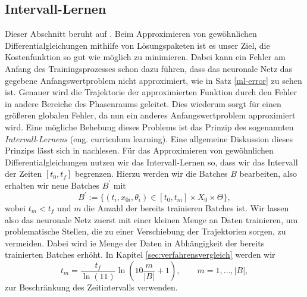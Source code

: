 \subsection{Intervall-Lernen}
\label{subsec:curriculum-learning}
Dieser Abschnitt beruht auf \cite{cedricflamantPersonlicheKommunikation2022}.
Beim Approximieren von gewöhnlichen Differentialgleichungen mithilfe von Lösungspaketen ist es unser Ziel, die
Kostenfunktion so gut wie möglich zu minimieren. Dabei kann ein Fehler am Anfang des Trainingsprozesses schon dazu
führen, dass das neuronale Netz das gegebene Anfangswertproblem nicht approximiert, wie in Satz \ref{ml-error} zu sehen
ist. Genauer wird die Trajektorie der approximierten Funktion durch den Fehler in andere Bereiche des Phasenraums
geleitet. Dies wiederum sorgt für einen größeren globalen Fehler, da nun ein anderes Anfangswertproblem approximiert
wird. Eine mögliche Behebung dieses Problems ist das Prinzip des sogenannten \textit{Intervall}-\textit{Lernens}
(eng. curriculum learning). Eine allgemeine Diskussion dieses Prinzips lässt sich in \cite{bengioCurriculumLearning2009}
nachlesen. Für das Approximieren von gewöhnlichen Differentialgleichungen nutzen wir das Intervall-Lernen so, dass wir
das Intervall der Zeiten $[t_0, t_f]$ begrenzen. Hierzu werden wir die Batches $B$ bearbeiten, also erhalten wir neue
Batches $B^{\prime}$ mit
\[
    B^{\prime}:=  \{(t_i,x_{0i},\theta_i) \in [t_0,t_m] \times X_0 \times \Theta\},
\]
wobei $t_m<t_f$ und $m$ die Anzahl der bereits trainieren Batches ist. Wir lassen also das neuronale Netz zuerst mit
einer kleinen Menge an Daten trainieren, um problematische Stellen, die zu einer Verschiebung der Trajektorien sorgen,
zu vermeiden. Dabei wird ie Menge der Daten in Abhängigkeit der bereits trainierten Batches erhöht. In Kapitel
\ref{sec:verfahrensvergleich} werden wir
\[
    t_m = \frac{t_f}{\ln(11)} \ln(10 \frac{m}{|B|} + 1), \qquad m = 1, \dots, |B|,
\]
zur Beschränkung des Zeitintervalls verwenden.


